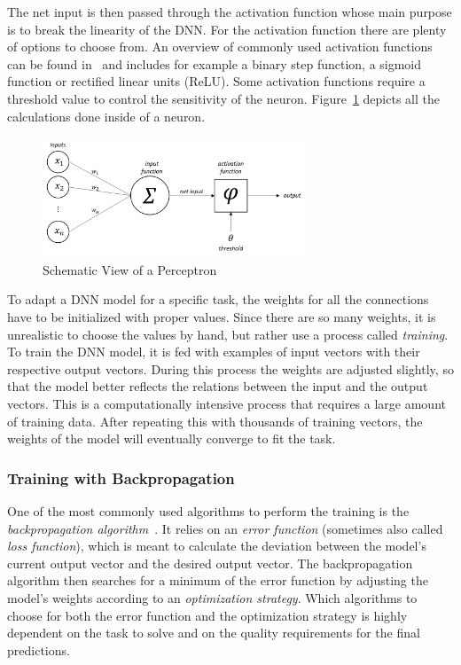 The net input is then passed through the activation function whose main purpose is to break the linearity of the DNN. For the activation function there are plenty of options to choose from. An overview of commonly used activation functions can be found in~\cite{act_funcs18} and includes for example a binary step function, a sigmoid function or rectified linear units (ReLU). Some activation functions require a threshold value to control the sensitivity of the neuron. Figure~\ref{fig:perceptron} depicts all the calculations done inside of a neuron.

\begin{figure}[h]
    \centering
    \includegraphics[width=0.7\textwidth]{images/perceptron}
    \caption[Schematic View of a Perceptron]{Schematic View of a Perceptron~\cite[p.~257, modified]{praxiseinstieg_ml17}}
    \label{fig:perceptron}
\end{figure}

To adapt a DNN model for a specific task, the weights for all the connections have to be initialized with proper values. Since there are so many weights, it is unrealistic to choose the values by hand, but rather use a process called \emph{training}. To train the DNN model, it is fed with examples of input vectors with their respective output vectors. During this process the weights are adjusted slightly, so that the model better reflects the relations between the input and the output vectors. This is a computationally intensive process that requires a large amount of training data. After repeating this with thousands of training vectors, the weights of the model will eventually converge to fit the task.

\subsubsection{Training with Backpropagation}
One of the most commonly used algorithms to perform the training is the \emph{backpropagation algorithm}~\cite[pp.~151ff]{nn_intro96}. It relies on an \emph{error function} (sometimes also called \emph{loss function}), which is meant to calculate the deviation between the model's current output vector and the desired output vector. The backpropagation algorithm then searches for a minimum of the error function by adjusting the model's weights according to an \emph{optimization strategy}. Which algorithms to choose for both the error function and the optimization strategy is highly dependent on the task to solve and on the quality requirements for the final predictions.

